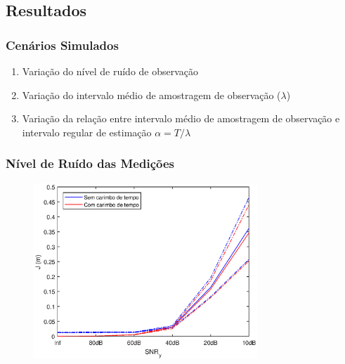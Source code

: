 \documentclass{beamer}
\renewcommand{\(}{\left(}
\renewcommand{\)}{\right)}
\renewcommand{\[}{\left[}
\renewcommand{\]}{\right]}
\begin{document}

\subsection{Resultados} 


\begin{frame}
	\frametitle{Cenários Simulados}
	
	\begin{enumerate}
		\item Variação do nível de ruído de observação
		\vspace{0.5cm}
		\item Variação do intervalo médio de amostragem	de observação ($\lambda$)
		\vspace{0.5cm}
		\item Variação da relação entre intervalo médio de amostragem de observação e intervalo regular de estimação $\alpha=T/\lambda$
	\end{enumerate}

\end{frame}



\begin{frame}
	\frametitle{Nível de Ruído das Medições}
	
	\begin{figure}
		\centering
		\includegraphics[width=0.75\textwidth]{images/noise.eps}
	\end{figure}


\end{frame}
\end{document}
